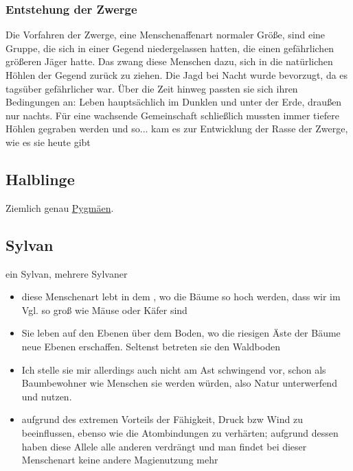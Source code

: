 \subsubsection{Entstehung der Zwerge}
Die Vorfahren der Zwerge, eine Menschenaffenart normaler Größe, sind eine Gruppe, die sich in einer Gegend niedergelassen hatten, die einen gefährlichen größeren Jäger hatte. Das zwang diese Menschen dazu, sich in die natürlichen Höhlen der Gegend zurück zu ziehen. Die Jagd bei Nacht wurde bevorzugt, da es tagsüber gefährlicher war. Über die Zeit hinweg passten sie sich ihren Bedingungen an: Leben hauptsächlich im Dunklen und unter der Erde, draußen nur nachts. Für eine wachsende Gemeinschaft schließlich mussten immer tiefere Höhlen gegraben werden und so... kam es zur Entwicklung der Rasse der Zwerge, wie es sie heute gibt



\subsection{Halblinge} \label{rasse:halblinge}
Ziemlich genau \href{https://de.wikipedia.org/wiki/Pygm\%C3\%A4en}{Pygmäen}.


\subsection{Sylvan} \label{rasse:sylvan}
ein Sylvan, mehrere Sylvaner
\begin{itemize}
	\item diese Menschenart lebt in dem , wo die Bäume so hoch werden, dass wir im Vgl. so groß wie Mäuse oder Käfer sind
	\item Sie leben auf den Ebenen über dem Boden, wo die riesigen Äste der Bäume neue Ebenen erschaffen. Seltenst betreten sie den Waldboden
	\item Ich stelle sie mir allerdings auch nicht am Ast schwingend vor, schon als Baumbewohner wie Menschen sie werden würden, also Natur unterwerfend und nutzen.
	\item aufgrund des extremen Vorteils der Fähigkeit, Druck bzw Wind zu beeinflussen, ebenso wie die Atombindungen zu verhärten; aufgrund dessen haben diese Allele alle anderen verdrängt und man findet bei dieser Menschenart keine andere Magienutzung mehr
\end{itemize}

